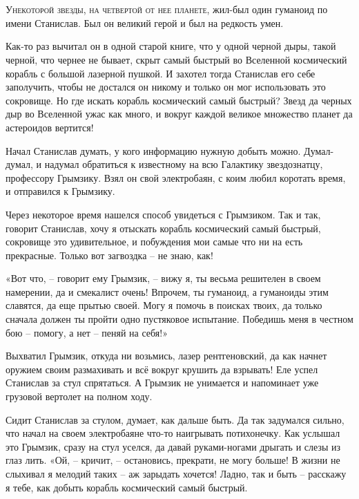 \documentclass[ebook,oneside,final,openright]{memoir}
\begin{document}
\chapter{}
 \lettrine{У}{некоторой звезды, на четвертой от нее планете,} жил-был один гуманоид по имени Станислав. Был он великий герой и был на редкость умен.\par
\par
Как-то раз вычитал он в одной старой книге, что у одной черной дыры, такой черной, что чернее не бывает, скрыт самый быстрый во Вселенной космический корабль с большой лазерной пушкой. И захотел тогда Станислав его себе заполучить, чтобы не достался он никому и только он мог использовать это сокровище. Но где искать корабль космический самый быстрый? Звезд да черных дыр во Вселенной ужас как много, и вокруг каждой великое множество планет да астероидов вертится!\par
\par
Начал Станислав думать, у кого информацию нужную добыть можно. Думал-думал, и надумал обратиться к известному на всю Галактику звездознатцу, профессору Грымзику. Взял он свой электробаян, с коим любил коротать время, и отправился к Грымзику.\par
\par
Через некоторое время нашелся способ увидеться с Грымзиком. Так и так, говорит Станислав, хочу я отыскать корабль космический самый быстрый, сокровище это удивительное, и побуждения мои самые что ни на есть прекрасные. Только вот загвоздка – не знаю, как!\par
\par
«Вот что, – говорит ему Грымзик, – вижу я, ты весьма решителен в своем намерении, да и смекалист очень! Впрочем, ты гуманоид, а гуманоиды этим славятся, да еще прытью своей. Могу я помочь в поисках твоих, да только сначала должен ты пройти одно пустяковое испытание. Победишь меня в честном бою – помогу, а нет – пеняй на себя!» \par
\par
Выхватил Грымзик, откуда ни возьмись, лазер рентгеновский, да как начнет оружием своим размахивать и всё вокруг крушить да взрывать! Еле успел Станислав за стул спрятаться. А Грымзик не унимается и напоминает уже грузовой вертолет на полном ходу. \par
\par
Сидит Станислав за стулом, думает, как дальше быть. Да так задумался сильно, что начал на своем электробаяне что-то наигрывать потихонечку. Как услышал это Грымзик, сразу на стул уселся, да давай руками-ногами дрыгать и слезы из глаз лить. «Ой, – кричит, – остановись, прекрати, не могу больше! В жизни не слыхивал я мелодий таких – аж зарыдать хочется! Ладно, так и быть – расскажу я тебе, как добыть корабль космический самый быстрый.\par
\end{document}

